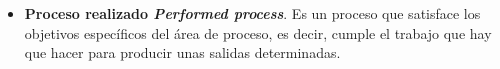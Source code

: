 \begin{itemize}
\item \textbf{Proceso realizado \textit{Performed process}}. Es un proceso que satisface los objetivos específicos del área de proceso, es decir, cumple el trabajo que hay que hacer para producir unas salidas determinadas.



\end{itemize}
